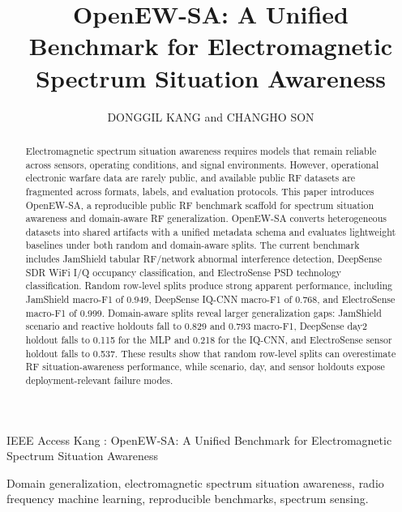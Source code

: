 \documentclass{ieeeaccess}
\begin{document}
\doi{}

\title{OpenEW-SA: A Unified Benchmark for Electromagnetic Spectrum Situation Awareness}
\author{\uppercase{Donggil Kang} and
\uppercase{Changho Son}}
\address[1]{Department of Precision Medicine, Sungkyunkwan University School of Medicine, Suwon 16419, Republic of Korea}
\address[2]{Department of Defense System Science, Korea Army Academy, 495 Hoguk-ro, Gogyeong-myeon, Yeongcheon 38900, South Korea}
\markboth
{IEEE Access}
{Kang \headeretal: OpenEW-SA: A Unified Benchmark for Electromagnetic Spectrum Situation Awareness}

\begin{abstract}
Electromagnetic spectrum situation awareness requires models that remain reliable across sensors, operating conditions, and signal environments. However, operational electronic warfare data are rarely public, and available public RF datasets are fragmented across formats, labels, and evaluation protocols. This paper introduces OpenEW-SA, a reproducible public RF benchmark scaffold for spectrum situation awareness and domain-aware RF generalization. OpenEW-SA converts heterogeneous datasets into shared artifacts with a unified metadata schema and evaluates lightweight baselines under both random and domain-aware splits. The current benchmark includes JamShield tabular RF/network abnormal interference detection, DeepSense SDR WiFi I/Q occupancy classification, and ElectroSense PSD technology classification. Random row-level splits produce strong apparent performance, including JamShield macro-F1 of 0.949, DeepSense IQ-CNN macro-F1 of 0.768, and ElectroSense macro-F1 of 0.999. Domain-aware splits reveal larger generalization gaps: JamShield scenario and reactive holdouts fall to 0.829 and 0.793 macro-F1, DeepSense day2 holdout falls to 0.115 for the MLP and 0.218 for the IQ-CNN, and ElectroSense sensor holdout falls to 0.537. These results show that random row-level splits can overestimate RF situation-awareness performance, while scenario, day, and sensor holdouts expose deployment-relevant failure modes.
\end{abstract}

\begin{keywords}
Domain generalization, electromagnetic spectrum situation awareness, radio frequency machine learning, reproducible benchmarks, spectrum sensing.
\end{keywords}
\end{document}
